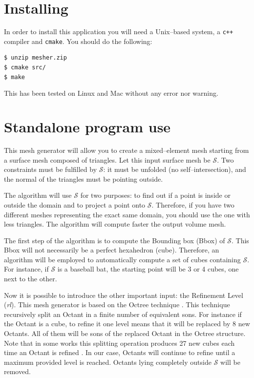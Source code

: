\documentclass[10pt]{article}
\begin{document}
\section{Installing}
\label{install}

In order to install this application you will need a Unix--based system, a \texttt{c++} compiler and \texttt{cmake}. You should do the following:

{\small
\begin{verbatim}
$ unzip mesher.zip
$ cmake src/
$ make
\end{verbatim}
}

This has been tested on Linux and Mac without any error nor warning.

\section{Standalone program use}
\label{standalone}


This mesh generator will allow you to create a mixed--element mesh starting from a surface mesh composed of triangles. Let this input surface mesh be $\mathcal{S}$. Two constraints must be fulfilled by $\mathcal{S}$: it must be unfolded (no self--intersection), and the normal of the triangles must be pointing outside.

The algorithm will use $\mathcal{S}$ for two purposes: to find out if a point is inside or outside the domain and to project a point onto $\mathcal{S}$. Therefore, if you have two different meshes representing the exact same domain, you should use the one with less triangles. The algorithm will compute faster the output volume mesh.

The first step of the algorithm is to compute the Bounding box (Bbox) of $\mathcal{S}$. This Bbox will not necessarily be a perfect hexahedron (cube). Therefore, an algorithm will be employed to automatically compute a set of cubes containing $\mathcal{S}$. For instance, if $\mathcal{S}$ is a baseball bat, the starting point will be 3 or 4 cubes, one  next to the other.

Now it is possible to introduce the other important input: the Refinement Level (\textit{rl}). This mesh generator is based on the  Octree technique \cite{Yerry1984,Shephard1991}. This technique recursively split an Octant in a finite number of equivalent sons. For instance if the Octant is a cube, to refine it one level means that it will be replaced by 8 new Octants. All of them will be sons of the replaced Octant in the Octree structure. Note that in some works this splitting operation produces 27 new cubes each time an Octant is refined \cite{Schneiders1996,Zhang2006,Ito2009}. In our case, Octants will continue to refine until a maximum provided level is reached. Octants lying completely outside $\mathcal{S}$ will be removed.
\end{document}
